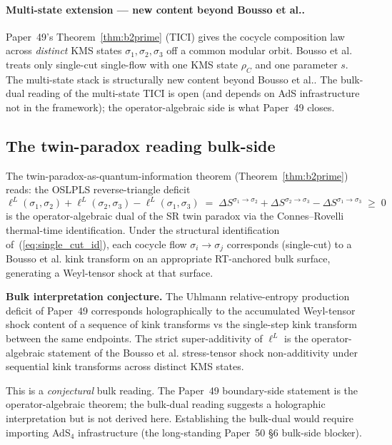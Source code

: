 \documentclass[11pt,a4paper]{article}
\theoremstyle{plain}
\theoremstyle{definition}
\begin{document}
\paragraph{Multi-state extension --- new content beyond Bousso et al..}
Paper~49's Theorem~\ref{thm:b2prime} (TICI) gives the cocycle
composition law across \emph{distinct} KMS states $\sigma_{1},
\sigma_{2}, \sigma_{3}$ off a common modular orbit. Bousso et al. treats only
single-cut single-flow with one KMS state $\rho_{C}$ and one
parameter $s$. The multi-state stack is structurally new content
beyond Bousso et al.. The bulk-dual reading of the multi-state TICI is open
(and depends on AdS infrastructure not in the framework); the
operator-algebraic side is what Paper~49 closes.

\subsection{The twin-paradox reading bulk-side}
\label{sec:twin_paradox_bulk}

The twin-paradox-as-quantum-information theorem
(Theorem~\ref{thm:b2prime}) reads: the OSLPLS reverse-triangle
deficit
\[
\ell^{L}(\sigma_{1}, \sigma_{2}) + \ell^{L}(\sigma_{2}, \sigma_{3}) - \ell^{L}(\sigma_{1}, \sigma_{3})
\;=\; \Delta S^{\sigma_{1} \to \sigma_{2}} + \Delta S^{\sigma_{2} \to \sigma_{3}} - \Delta S^{\sigma_{1} \to \sigma_{3}}
\;\ge\; 0
\]
is the operator-algebraic dual of the SR twin paradox via the
Connes--Rovelli thermal-time identification. Under the structural
identification of~(\ref{eq:single_cut_id}), each cocycle flow
$\sigma_{i} \to \sigma_{j}$ corresponds (single-cut) to a Bousso et al. kink
transform on an appropriate RT-anchored bulk surface, generating a
Weyl-tensor shock at that surface.

\textbf{Bulk interpretation conjecture.} The Uhlmann
relative-entropy production deficit of Paper~49 corresponds
holographically to the accumulated Weyl-tensor shock content of a
sequence of kink transforms vs the single-step kink transform between
the same endpoints. The strict super-additivity of $\ell^{L}$ is the
operator-algebraic statement of the Bousso et al. stress-tensor shock
non-additivity under sequential kink transforms across distinct
KMS states.

This is a \emph{conjectural} bulk reading. The Paper~49 boundary-side
statement is the operator-algebraic theorem; the bulk-dual reading
suggests a holographic interpretation but is not derived here.
Establishing the bulk-dual would require importing AdS$_{4}$
infrastructure (the long-standing Paper~50 \S6 bulk-side blocker).
\end{document}
